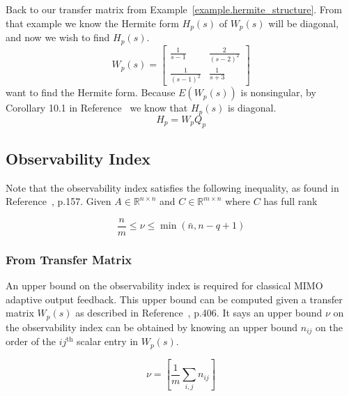 \begin{example}
  Back to our transfer matrix from Example~\ref{example.hermite_structure}.
  From that example we know the Hermite form $H_{p}(s)$ of $W_{p}(s)$ will be diagonal, and now we wish to find $H_{p}(s)$.
  \begin{equation*}
    W_{p}(s)=
    \begin{bmatrix}
      \frac{1}{s-1}& \frac{2}{(s-2)^{2}} \\
      \frac{1}{(s-1)^{2}} & \frac{1}{s+3}
    \end{bmatrix}
  \end{equation*}
  want to find the Hermite form.
  Because $E(W_{p}(s))$ is nonsingular, by Corollary 10.1 in Reference~\cite{narendra.stable.2005} we know that $H_{p}(s)$ is diagonal.
  \begin{equation*}
    H_{p}=W_{p}Q_{p}
  \end{equation*}
\end{example}

\subsection{Observability Index}

Note that the observability index satisfies the following inequality, as found in Reference~\cite{chen.linear.1999}, p.157.
Given $A\in\mathbb{R}^{n\times n}$ and $C\in\mathbb{R}^{m\times n}$ where $C$ has full rank

\begin{equation*}
  \frac{n}{m}\leq\nu\leq\min(\bar{n},n-q+1)
\end{equation*}

\subsubsection{From Transfer Matrix}

An upper bound on the observability index is required for classical MIMO adaptive output feedback.
This upper bound can be computed given a transfer matrix $W_{p}(s)$ as described in Reference~\cite{narendra.stable.2005}, p.406.
It says an upper bound $\nu$ on the observability index can be obtained by knowing an upper bound $n_{ij}$ on the order of the $ij^{\text{th}}$ scalar entry in $W_{p}(s)$.

\begin{equation*}
  \nu=\left[\frac{1}{m}\sum_{i,j}n_{ij}\right]
\end{equation*}

